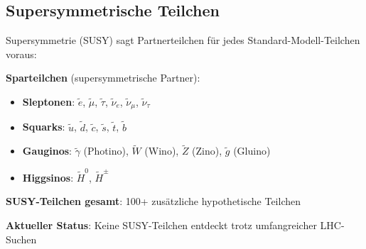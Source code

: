 	\begin{table}[htbp]
		\centering
		\caption{Hypothetische Teilchen jenseits des Standard-Modells}
		\label{tab:hypothetical_particles}
	\end{table}
	
	\subsection{Supersymmetrische Teilchen}
	
	Supersymmetrie (SUSY) sagt Partnerteilchen für jedes Standard-Modell-Teilchen voraus:
	
	\textbf{Sparteilchen} (supersymmetrische Partner):
	\begin{itemize}
		\item \textbf{Sleptonen}: $\tilde{e}$, $\tilde{\mu}$, $\tilde{\tau}$, $\tilde{\nu}_e$, $\tilde{\nu}_\mu$, $\tilde{\nu}_\tau$
		\item \textbf{Squarks}: $\tilde{u}$, $\tilde{d}$, $\tilde{c}$, $\tilde{s}$, $\tilde{t}$, $\tilde{b}$
		\item \textbf{Gauginos}: $\tilde{\gamma}$ (Photino), $\tilde{W}$ (Wino), $\tilde{Z}$ (Zino), $\tilde{g}$ (Gluino)
		\item \textbf{Higgsinos}: $\tilde{H}^0$, $\tilde{H}^{\pm}$
	\end{itemize}
	
	\textbf{SUSY-Teilchen gesamt}: 100+ zusätzliche hypothetische Teilchen
	
	\textbf{Aktueller Status}: Keine SUSY-Teilchen entdeckt trotz umfangreicher LHC-Suchen
	
